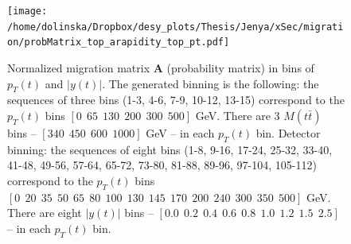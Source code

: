 \begin{figure}[p]
  \centering
  \texttt{[image: /home/dolinska/Dropbox/desy\_plots/Thesis/Jenya/xSec/migration/probMatrix\_top\_arapidity\_top\_pt.pdf]}
  \caption{Normalized migration matrix $\mathbf{A}$ (probability matrix) in bins of $p_{T}(t)$ and $|y(t)|$. The generated binning is the following:
          the sequences of three bins (1-3, 4-6, 7-9, 10-12, 13-15) correspond to the $p_{T}(t)$ bins $[0\:\:65\:\:130\:\:200\:\:300\:\:500]$ GeV.
          There are 3 $M(t\bar{t})$ bins -- $[340\:\:450\:\:600\:\:1000]$ GeV -- in each $p_{T}(t)$ bin.
          Detector binning:
          the sequences of eight bins (1-8, 9-16, 17-24, 25-32, 33-40, 41-48, 49-56, 57-64, 65-72, 73-80, 81-88, 89-96, 97-104, 105-112) correspond 
          to the $p_{T}(t)$ bins $[0\:\:20\:\:35\:\:50\:\:65\:\:80\:\:100\:\:130\:\:145\:\:170\:\:200\:\:240\:\:300\:\:350\:\:500]$ GeV.
          There are eight $|y(t)|$ bins -- $[0.0\:\:0.2\:\:0.4\:\:0.6\:\:0.8\:\:1.0\:\:1.2\:\:1.5\:\:2.5]$ -- in each $p_{T}(t)$ bin.}
  \label{fig:migMat}
\end{figure}


